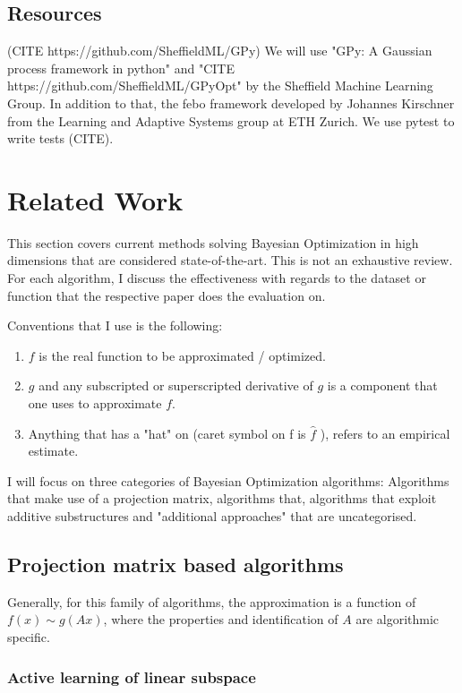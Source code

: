 \documentclass[a4paper,12pt,twoside,openright]{report}
\begin{document}
\section{Resources}
(CITE https://github.com/SheffieldML/GPy)
We will use "GPy: A Gaussian process framework in python" and "CITE https://github.com/SheffieldML/GPyOpt" by the Sheffield Machine Learning Group.
In addition to that, the febo framework developed by Johannes Kirschner from the Learning and Adaptive Systems group at ETH Zurich.
We use pytest to write tests (CITE).

\chapter{Related Work} \label{ch3}

This section covers current methods solving Bayesian Optimization in high dimensions that are considered state-of-the-art.
This is not an exhaustive review. 
For each algorithm, I discuss the effectiveness with regards to the dataset or function that the respective paper does the evaluation on.

Conventions that I use is the following:

\begin{enumerate}
\item $f$ is the real function to be approximated / optimized.
\item $g$ and any subscripted or superscripted derivative of $g$ is a component that one uses to approximate $f$.
\item Anything that has a "hat" on (caret symbol on f is $\hat{f}$ ), refers to an empirical estimate. 
\end{enumerate}

I will focus on three categories of Bayesian Optimization algorithms: Algorithms that make use of a projection matrix, algorithms that, algorithms that exploit additive substructures and "additional approaches" that are uncategorised.

\section{Projection matrix based algorithms}

Generally, for this family of algorithms, the approximation is a function of $f(x) \sim g(Ax)$, where the properties and identification of $A$ are algorithmic specific.

\subsection{Active learning of linear subspace}
\end{document}
